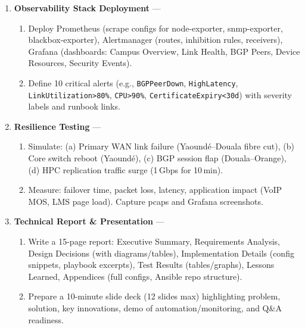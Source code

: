 \documentclass[11pt]{article}
\begin{document}
\begin{enumerate}
\begin{enumerate}
        \item Implement \textbf{idempotency} checks and \textbf{configuration drift detection} (run playbook in check mode daily via GitLab CI).
    \end{enumerate}
    \item \textbf{Observability Stack Deployment} —
    \begin{enumerate}
        \item Deploy Prometheus (scrape configs for node-exporter, snmp-exporter, blackbox-exporter), Alertmanager (routes, inhibition rules, receivers), Grafana (dashboards: Campus Overview, Link Health, BGP Peers, Device Resources, Security Events).
        \item Define 10 critical alerts (e.g., \texttt{BGPPeerDown}, \texttt{HighLatency}, \texttt{LinkUtilization>80\%}, \texttt{CPU>90\%}, \texttt{CertificateExpiry<30d}) with severity labels and runbook links.
    \end{enumerate}
    \item \textbf{Resilience Testing} —
    \begin{enumerate}
        \item Simulate: (a) Primary WAN link failure (Yaoundé–Douala fibre cut), (b) Core switch reboot (Yaoundé), (c) BGP session flap (Douala–Orange), (d) HPC replication traffic surge (1\,Gbps for 10\,min).
        \item Measure: failover time, packet loss, latency, application impact (VoIP MOS, LMS page load). Capture pcaps and Grafana screenshots.
    \end{enumerate}
    \item \textbf{Technical Report \& Presentation} —
    \begin{enumerate}
        \item Write a 15-page report: Executive Summary, Requirements Analysis, Design Decisions (with diagrams/tables), Implementation Details (config snippets, playbook excerpts), Test Results (tables/graphs), Lessons Learned, Appendices (full configs, Ansible repo structure).
        \item Prepare a 10-minute slide deck (12 slides max) highlighting problem, solution, key innovations, demo of automation/monitoring, and Q\&A readiness.
    \end{enumerate}
\end{enumerate}
\end{document}
